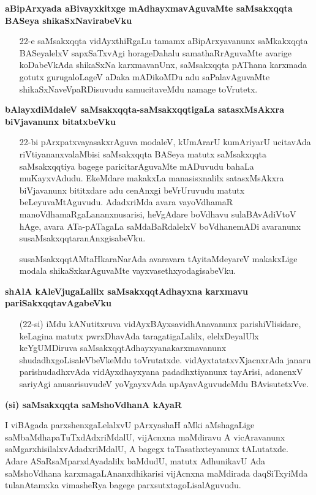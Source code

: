\noindent
\textbf{aBipArxyada aBivayxkitxge mAdhayxmavAguvaMte saMsakxqqta BASeya shikaSxNavirabeVku}\label{page52}

\begin{itemize}
\item[22-e] saMsakxqqta vidAyxthiRgaLu tamamx aBipArxyavanunx saMkakxqqta BASeyalelxV sapxSaTxvAgi horageDahalu samathaRrAguvaMte avarige koDabeVkAda shikaSxNa karxmavanUnx, saMsakxqqta pAThana karxmada gotutx gurugaloLageV aDaka mADikoMDu adu saPalavAguvaMte shikaSxNaveVpaRDisuvudu samucitaveMdu namage toVrutetx.
\end{itemize}

\noindent
\textbf{bAlayxdiMdaleV saMsakxqqta-saMsakxqqtigaLa satasxMsAkxra biVjavanunx bitatxbeVku}\label{page53}

\begin{itemize}
\item[22-bi] pArxpatxvayasakxrAguva modaleV, kUmArarU kumAriyarU ucitavAda riVtiyananxvalaMbisi saMsakxqqta BASeya matutx saMsakxqqta saMsakxqqtiya bagege paricitarAguvaMte mADuvudu bahaLa muKayxvAdudu. EkeMdare makakxLa manasisxnalilx satasxMsAkxra biVjavanunx bititxdare adu cenAnxgi beVrUruvudu matutx beLeyuvaMtAguvudu. AdadxriMda avara vayoVdhamaR manoVdhamaRgaLananxnusarisi, heVgAdare boVdhavu sulaBAvAdiVtoV hAge, avara ATa-pATagaLa saMdaBaRdalelxV boVdhanemADi avaranunx susaMsakxqqtaranAnxgisabeVku.

susaMsakxqqtAMtaHkaraNarAda avaravara tAyitaMdeyareV makakxLige modala shikaSxkarAguvaMte vayxvasethxyodagisabeVku.
\end{itemize}

\noindent
\textbf{shAlA kAleVjugaLalilx saMsakxqqtAdhayxna karxmavu pariSakxqqtavAgabeVku}\label{page53}

\begin{itemize}
\item[(22-si)] iMdu kANutitxruva vidAyxBAyxsavidhAnavanunx parishiVlisidare, keLagina matutx pwrxDhavAda taragatigaLalilx, elelxDeyalUlx keYgUMDiruva saMsakxqqtAdhayxyanakarxmavanunx shudadhxgoLisaleVbeVkeMdu toVrutatxde. vidAyxtatatxvXjacnxrAda janaru parishudadhxvAda vidAyxdhayxyana padadhxtiyanunx tayArisi,
adanenxV sariyAgi anusarisuvudeV yoVgayxvAda upAyavAguvudeMdu BAvisutetxVve.
\end{itemize}

\noindent
\textbf{(si) saMsakxqqta saMshoVdhanA kAyaR}\label{page53}

I viBAgada parxshenxgaLelalxvU pArxyashaH aMki aMshagaLige saMbaMdhapaTuTxdAdxriMdalU, vijAcnxna maMdiravu A vicAravanunx saMgarxhisilalxvAdadxriMdalU, A bagegx taTasathxteyanunx tALutatxde. Adare ASaRsaMparxdAyadalilx baMdudU, matutx AdhunikavU Ada saMshoVdhana karxmagaLAnanxdhikarisi vijAcnxna maMdirada daqSiTxyiMda tulanAtamxka vimasheRya bagege parxsutxtagoLisalAguvudu.

